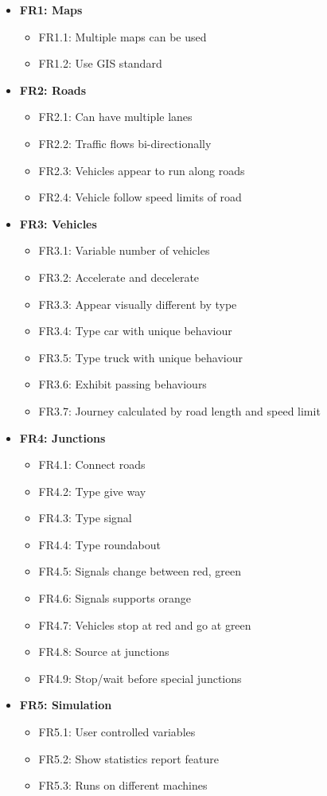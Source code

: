 \documentclass[11pt]{article}
\begin{document}
\begin{itemize}\itemsep0pt
\item \textbf{FR1: Maps} 
	\begin{itemize}
	\item FR1.1: Multiple maps can be used
	\item FR1.2: Use GIS standard
	\end{itemize}
\item \textbf{FR2: Roads}
	\begin{itemize}
	\item FR2.1: Can have multiple lanes
	\item FR2.2: Traffic flows bi-directionally 
	\item FR2.3: Vehicles appear to run along roads
	\item FR2.4: Vehicle follow speed limits of road
	\end{itemize}
\item \textbf{FR3: Vehicles}
	\begin{itemize}
	\item FR3.1: Variable number of vehicles 
	\item FR3.2: Accelerate and decelerate
	\item FR3.3: Appear visually different by type
	\item FR3.4: Type car with unique behaviour
	\item FR3.5: Type truck with unique behaviour
	\item FR3.6: Exhibit passing behaviours
	\item FR3.7: Journey calculated by road length and speed limit
	\end{itemize}
\item \textbf{FR4: Junctions}
	\begin{itemize}
	\item FR4.1: Connect roads
	\item FR4.2: Type give way
	\item FR4.3: Type signal
	\item FR4.4: Type roundabout
	\item FR4.5: Signals change between red, green
	\item FR4.6: Signals supports orange
	\item FR4.7: Vehicles stop at red and go at green
	\item FR4.8: Source at junctions
	\item FR4.9: Stop/wait before special junctions
	\end{itemize}
\item \textbf{FR5: Simulation}
	\begin{itemize}
	\item FR5.1: User controlled variables
	\item FR5.2: Show statistics report feature
	\item FR5.3: Runs on different machines
	\end{itemize}
\end{itemize}
\end{document}
